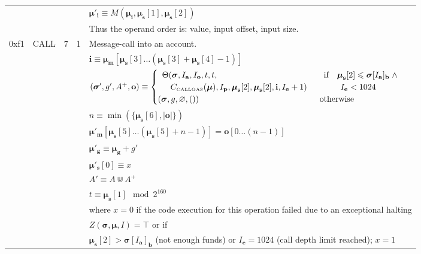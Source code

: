 \documentclass[9pt,oneside]{amsart}
\begin{document}
\begin{tabularx}{\textwidth}{rlrrX}
&&&& $\boldsymbol{\mu}'_\mathbf{i} \equiv M(\boldsymbol{\mu}_\mathbf{i}, \boldsymbol{\mu}_\mathbf{s}[1], \boldsymbol{\mu}_\mathbf{s}[2])$ \\
&&&& Thus the operand order is: value, input offset, input size. \\
\midrule
0xf1 & {\small CALL} & 7 & 1 & Message-call into an account. \\
&&&& $\mathbf{i} \equiv \boldsymbol{\mu}_\mathbf{m}[ \boldsymbol{\mu}_\mathbf{s}[3] \dots (\boldsymbol{\mu}_\mathbf{s}[3] + \boldsymbol{\mu}_\mathbf{s}[4] - 1) ]$ \\
&&&& $(\boldsymbol{\sigma}', g', A^+, \mathbf{o}) \equiv \begin{cases}\begin{array}{l}\Theta(\boldsymbol{\sigma}, I_\mathbf{a}, I_\mathbf{o}, t, t,\\ \quad C_{\text{\tiny CALLGAS}}(\boldsymbol{\mu}), I_\mathbf{p}, \boldsymbol{\mu}_\mathbf{s}[2], \boldsymbol{\mu}_\mathbf{s}[2], \mathbf{i}, I_\mathbf{e} + 1)\end{array} & \begin{array}{l}\text{if} \quad \boldsymbol{\mu}_\mathbf{s}[2] \leqslant \boldsymbol{\sigma}[I_\mathbf{a}]_\mathbf{b} \;\wedge \\ \quad\quad I_\mathbf{e} < 1024\end{array}\\ (\boldsymbol{\sigma}, g, \varnothing, ()) & \text{otherwise} \end{cases}$ \\
&&&& $n \equiv \min(\{ \boldsymbol{\mu}_\mathbf{s}[6], |\mathbf{o}|\})$ \\
&&&& $\boldsymbol{\mu}'_\mathbf{m}[ \boldsymbol{\mu}_\mathbf{s}[5] \dots (\boldsymbol{\mu}_\mathbf{s}[5] + n - 1) ] = \mathbf{o}[0 \dots (n - 1)]$ \\
&&&& $\boldsymbol{\mu}'_\mathbf{g} \equiv \boldsymbol{\mu}_\mathbf{g} + g'$ \\
&&&& $\boldsymbol{\mu}'_\mathbf{s}[0] \equiv x$ \\
&&&& $A' \equiv A \Cup A^+$ \\
&&&& $t \equiv \boldsymbol{\mu}_\mathbf{s}[1] \mod 2^{160}$ \\
&&&& where $x=0$ if the code execution for this operation failed due to an exceptional halting \\
&&&& $Z(\boldsymbol{\sigma}, \boldsymbol{\mu}, I) = \top$ or if  \\
&&&& $\boldsymbol{\mu}_\mathbf{s}[2] > \boldsymbol{\sigma}[I_\mathbf{a}]_\mathbf{b}$ (not enough funds) or $I_\mathbf{e} = 1024$ (call depth limit reached); $x=1$ \\

\end{tabularx}
\end{document}

